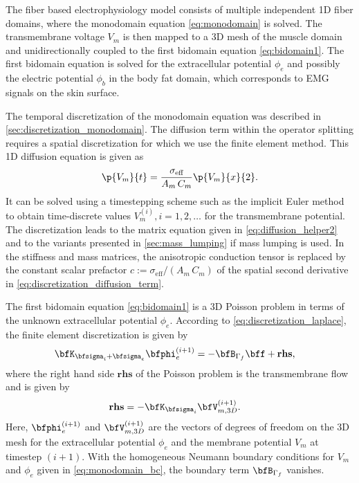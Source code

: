 The fiber based electrophysiology model consists of multiple independent 1D fiber domains, where the monodomain equation \cref{eq:monodomain} is solved. The transmembrane voltage $V_m$ is then mapped to a 3D mesh of the muscle domain and unidirectionally coupled to the first bidomain equation \cref{eq:bidomain1}. The first bidomain equation is solved for the extracellular potential $\phi_e$ and possibly the electric potential $\phi_b$ in the body fat domain, which corresponds to EMG signals on the skin surface.

The temporal discretization of the monodomain equation was described in \cref{sec:discretization_monodomain}. The diffusion term within the operator splitting requires a spatial discretization for which we use the finite element method. This 1D diffusion equation is given as
\begin{align}\label{eq:discretization_diffusion_term}
  \p{V_m}{t} = \dfrac{\sigma_\text{eff}}{A_m\,C_m} \p{V_m}{x}{2}.
\end{align}
It can be solved using a timestepping scheme such as the implicit Euler method to obtain time-discrete values $V_m^{(i)}, i=1,2,\dots$ for the transmembrane potential. The discretization leads to the matrix equation given in \cref{eq:diffusion_helper2} and to the variants presented in \cref{sec:mass_lumping} if mass lumping is used. In the stiffness and mass matrices, the anisotropic conduction tensor is replaced by the constant scalar prefactor $c := \sigma_\text{eff}/(A_m\,C_m)$ of the spatial second derivative in \cref{eq:discretization_diffusion_term}.

The first bidomain equation \cref{eq:bidomain1} is a 3D Poisson problem in terms of the unknown extracellular potential $\phi_e$. According to \cref{eq:discretization_laplace}, the finite element discretization is given by%
\begin{align*}
  \bfK_{\bfsigma_i + \bfsigma_e} \bfphi_e^{(i+1)} &= - \bfB_{\Gamma_f}\bff + \textbf{rhs},
\end{align*}
where the right hand side $\textbf{rhs}$ of the Poisson problem is the transmembrane flow and is given by
\begin{align}\label{eq:static_bidomain_rhs}
  \textbf{rhs} &= -\bfK_{\bfsigma_i} \bfV_{m,3D}^{(i+1)}.
\end{align}
Here, $\bfphi_e^{(i+1)}$ and $\bfV_{m,3D}^{(i+1)}$ are the vectors of degrees of freedom on the 3D mesh for the extracellular potential $\phi_e$ and the membrane potential $V_m$ at timestep $(i+1)$. With the homogeneous Neumann boundary conditions for $V_m$ and $\phi_e$ given in \cref{eq:monodomain_bc}, the boundary term $\bfB_{\Gamma_f}$ vanishes.

